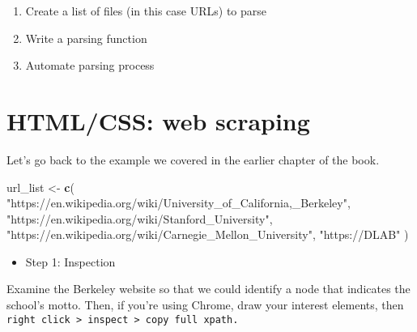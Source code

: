 \documentclass[
]{book}
\newenvironment{Shaded}{\begin{snugshade}}{\end{snugshade}}
\newcommand{\KeywordTok}[1]{\textcolor[rgb]{0.13,0.29,0.53}{\textbf{#1}}}
\newcommand{\NormalTok}[1]{#1}
\newcommand{\StringTok}[1]{\textcolor[rgb]{0.31,0.60,0.02}{#1}}
\providecommand{\tightlist}{%
  \setlength{\itemsep}{0pt}\setlength{\parskip}{0pt}}
\begin{document}
\begin{enumerate}
\def\labelenumi{\arabic{enumi}.}
\setcounter{enumi}{2}
\item
  Create a list of files (in this case URLs) to parse
\item
  Write a parsing function
\item
  Automate parsing process
\end{enumerate}

\hypertarget{htmlcss-web-scraping}{%
\section{HTML/CSS: web scraping}\label{htmlcss-web-scraping}}

Let's go back to the example we covered in the earlier chapter of the book.

\begin{Shaded}
\begin{Highlighting}[]
\NormalTok{url\_list \textless{}{-}}\StringTok{ }\KeywordTok{c}\NormalTok{(}
  \StringTok{"https://en.wikipedia.org/wiki/University\_of\_California,\_Berkeley"}\NormalTok{,}
  \StringTok{"https://en.wikipedia.org/wiki/Stanford\_University"}\NormalTok{,}
  \StringTok{"https://en.wikipedia.org/wiki/Carnegie\_Mellon\_University"}\NormalTok{,}
  \StringTok{"https://DLAB"}
\NormalTok{)}
\end{Highlighting}
\end{Shaded}

\begin{itemize}
\tightlist
\item
  Step 1: Inspection
\end{itemize}

Examine the Berkeley website so that we could identify a node that indicates the school's motto. Then, if you're using Chrome, draw your interest elements, then \texttt{right\ click\ \textgreater{}\ inspect\ \textgreater{}\ copy\ full\ xpath.}
\end{document}

